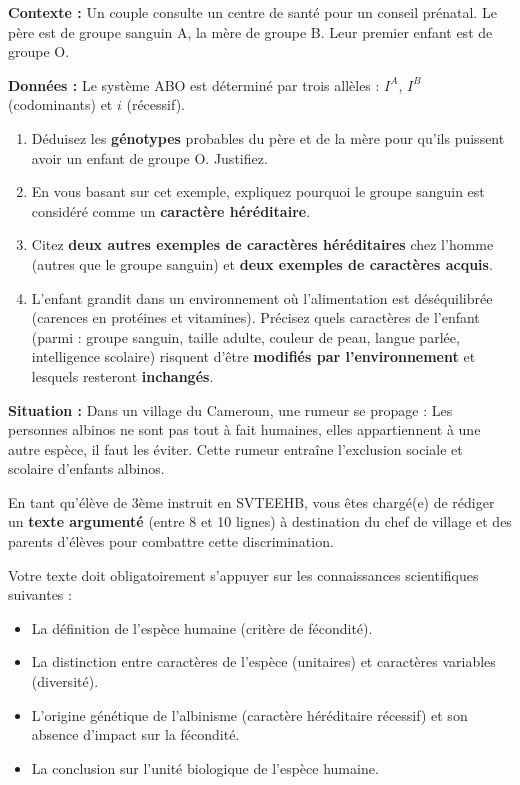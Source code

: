 \documentclass[11pt]{article}
\newcounter{popsec}
\newcounter{popsub}
\newcommand{\courssub}[1]{%
  \stepcounter{popsub}%
  \par\vspace{9pt}\noindent{\popxbold\fontsize{11.5}{13}\selectfont\color{popink}{\color{poporange}\thepopsec.\thepopsub}\hspace{6pt}#1}\par\nopagebreak\vspace{4pt}
}
\begin{document}
\courssub{Je me prépare au BEPC}

\begin{exercice}
\textbf{Contexte :} Un couple consulte un centre de santé pour un conseil prénatal. Le père est de groupe sanguin A, la mère de groupe B. Leur premier enfant est de groupe O.

\textbf{Données :} Le système ABO est déterminé par trois allèles : $I^A$, $I^B$ (codominants) et $i$ (récessif).
\begin{enumerate}
    \item Déduisez les \textbf{génotypes} probables du père et de la mère pour qu'ils puissent avoir un enfant de groupe O. Justifiez.
    \item En vous basant sur cet exemple, expliquez pourquoi le groupe sanguin est considéré comme un \textbf{caractère héréditaire}.
    \item Citez \textbf{deux autres exemples de caractères héréditaires} chez l'homme (autres que le groupe sanguin) et \textbf{deux exemples de caractères acquis}.
    \item L'enfant grandit dans un environnement où l'alimentation est déséquilibrée (carences en protéines et vitamines). Précisez quels caractères de l'enfant (parmi : groupe sanguin, taille adulte, couleur de peau, langue parlée, intelligence scolaire) risquent d'être \textbf{modifiés par l'environnement} et lesquels resteront \textbf{inchangés}.
\end{enumerate}
\end{exercice}

\begin{exercice}
\textbf{Situation :} Dans un village du Cameroun, une rumeur se propage : \og Les personnes albinos ne sont pas tout à fait humaines, elles appartiennent à une autre espèce, il faut les éviter. \fg Cette rumeur entraîne l'exclusion sociale et scolaire d'enfants albinos.

En tant qu'élève de 3ème instruit en SVTEEHB, vous êtes chargé(e) de rédiger un \textbf{texte argumenté} (entre 8 et 10 lignes) à destination du chef de village et des parents d'élèves pour combattre cette discrimination.

Votre texte doit obligatoirement s'appuyer sur les connaissances scientifiques suivantes :
\begin{itemize}
    \item La définition de l'espèce humaine (critère de fécondité).
    \item La distinction entre caractères de l'espèce (unitaires) et caractères variables (diversité).
    \item L'origine génétique de l'albinisme (caractère héréditaire récessif) et son absence d'impact sur la fécondité.
    \item La conclusion sur l'unité biologique de l'espèce humaine.
\end{itemize}
\end{exercice}
\end{document}
